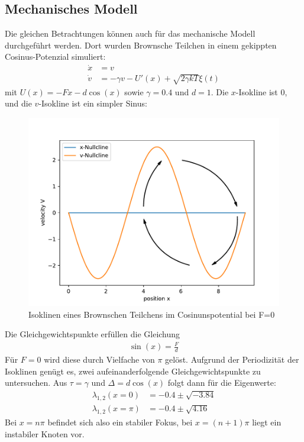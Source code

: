\documentclass[12pt,a4paper]{article}
\begin{document}
\subsection{Mechanisches Modell}
Die gleichen Betrachtungen können auch für das mechanische Modell durchgeführt werden. Dort wurden Brownsche Teilchen in einem gekippten Cosinus-Potenzial simuliert:
\begin{align*}
\dot{x}&=v\\
\dot{v}&=-\gamma v-U'(x)+\sqrt{2\gamma kT}\xi(t)
\end{align*}
mit $U(x)=-Fx-d\cos(x)$ sowie $\gamma=0.4$ und $d=1$. Die $x$-Isokline ist 0, und die $v$-Isokline ist ein simpler Sinus:
\begin{figure}[H]
	\centering
	\includegraphics[scale=0.9]{nullclinemm.pdf} 
	\caption{Isoklinen eines Brownschen Teilchens im Cosinunspotential bei F=0}
	\label{miso}
\end{figure} 
Die Gleichgewichtspunkte erfüllen die Gleichung
\begin{align}
\sin(x)=\frac{F}{d}
\end{align}
Für $F=0$ wird diese durch Vielfache von $\pi$ gelöst. Aufgrund der Periodizität der Isoklinen genügt es, zwei aufeinanderfolgende Gleichgewichtspunkte zu untersuchen. Aus $\tau=\gamma$ und $\Delta=d\cos(x)$ folgt dann für die Eigenwerte:
\begin{align*}
\lambda_{1,2}(x=0)&=-0.4\pm\sqrt{-3.84}\\\lambda_{1,2}(x=\pi)&=-0.4\pm\sqrt{4.16}
\end{align*}
Bei $x=n\pi$ befindet sich also ein stabiler Fokus, bei $x=(n+1)\pi$ liegt ein instabiler Knoten vor.\\
\end{document}
